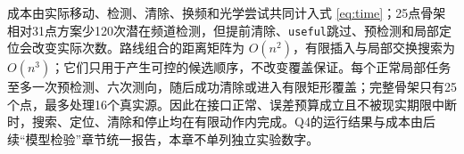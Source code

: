 成本由实际移动、检测、清除、换频和光学尝试共同计入式 \eqref{eq:time}；25点骨架相对31点方案少120次潜在频道检测，但提前清除、\texttt{useful}跳过、预检测和局部定位会改变实际次数。路线组合的距离矩阵为 $O(n^2)$，有限插入与局部交换搜索为 $O(n^3)$；它们只用于产生可控的候选顺序，不改变覆盖保证。每个正常局部任务至多一次预检测、六次测向，随后成功清除或进入有限矩形覆盖；完整骨架只有25个点，最多处理16个真实源。因此在接口正常、误差预算成立且不被现实期限中断时，搜索、定位、清除和停止均在有限动作内完成。Q4的运行结果与成本由后续“模型检验”章节统一报告，本章不单列独立实验数字。

